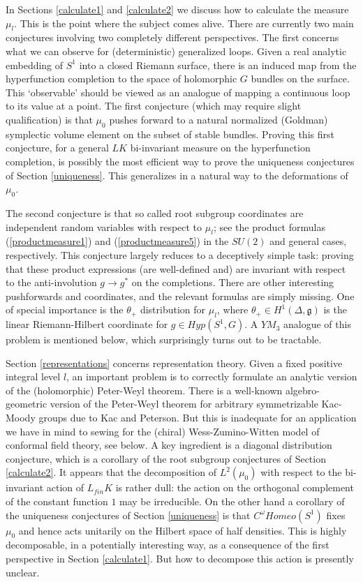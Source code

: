 \documentclass{amsart}
\theoremstyle{conjecture}
\theoremstyle{definition}
\theoremstyle{question}
\theoremstyle{questions}
\theoremstyle{remark}
\theoremstyle{remarks}
\theoremstyle{example}
\numberwithin{equation}{section}
\begin{document}
In Sections \ref{calculate1} and \ref{calculate2} we discuss how to calculate the measure $\mu_l$. This is the point where the subject
comes alive. There are currently two main conjectures involving two completely different perspectives. The first concerns what we can observe for (deterministic) generalized loops.
Given a real analytic embedding of $S^1$ into a closed Riemann surface, there is an induced map from the hyperfunction completion to the space of holomorphic $G$ bundles on the surface. This `observable' should be viewed as an analogue of mapping a continuous loop to its value at a point. The first conjecture (which may require slight qualification) is that $\mu_0$ pushes forward to a natural normalized (Goldman) symplectic volume element on the subset of stable bundles. Proving this first conjecture, for a general $LK$ bi-invariant measure on the hyperfunction completion, is possibly the most efficient way to prove the uniqueness conjectures of Section \ref{uniqueness}. This generalizes in a natural way
to the deformations of $\mu_0$. 

The second conjecture is that so called root subgroup coordinates are independent random variables with respect to $\mu_l$; see the product formulas (\ref{productmeasure1}) and (\ref{productmeasure5}) in the $SU(2)$ and general cases, respectively. This conjecture largely reduces to a deceptively simple task: proving that these product expressions
(are well-defined and) are invariant with respect to the anti-involution
$g \to g^*$ on the completions.  There are other interesting pushforwards and coordinates, and the relevant formulas are simply missing.
One of special importance is the $\theta_+$ distribution for $\mu_l$, where $\theta_+\in H^1(\Delta,\mathfrak g)$ is the linear Riemann-Hilbert coordinate for $g\in Hyp(S^1,G)$.
A $YM_3$ analogue of this problem is mentioned below, which surprisingly turns out to be tractable.

Section \ref{representations} concerns representation theory. Given a fixed positive integral level $l$, an important problem is to correctly formulate an analytic version of the (holomorphic) Peter-Weyl theorem. There is a well-known algebro-geometric version of the Peter-Weyl theorem for arbitrary symmetrizable Kac-Moody groups due to Kac and Peterson. But this is inadequate for an application we have in mind to sewing for the (chiral) Wess-Zumino-Witten model of conformal field theory, see below. A key ingredient is a diagonal distribution conjecture, which is a corollary of the root subgroup conjectures of Section \ref{calculate2}. It appears that the decomposition of $L^2(\mu_0)$ with respect to the bi-invariant action of $L_{fin}K$ is rather dull: the action on the orthogonal complement of the constant function $1$ may be irreducible. On the other hand a corollary of the uniqueness conjectures of Section \ref{uniqueness} is that $C^{\omega}Homeo(S^1)$ fixes $\mu_0$ and hence acts unitarily on the Hilbert space of half densities. This is highly decomposable, in a potentially interesting way, as a consequence of the first perspective in Section \ref{calculate1}. But how to decompose this action is presently unclear.
\end{document}
